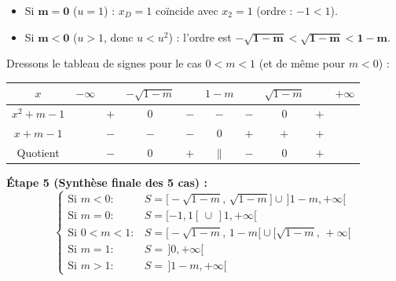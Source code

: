 \begin{exemple}
\begin{enumerate}
\begin{itemize}
        \item Si $\mathbf{m = 0}$ ($u = 1$) : $x_D = 1$ coïncide avec $x_2 = 1$ (ordre : $-1 < 1$).
        \item Si $\mathbf{m < 0}$ ($u > 1$, donc $u < u^2$) : l'ordre est $\mathbf{-\sqrt{1 - m} < \sqrt{1 - m} < 1 - m}$.
    \end{itemize}
    Dressons le tableau de signes pour le cas $0 < m < 1$ (et de même pour $m < 0$) :
    \begin{center}
    \renewcommand{\arraystretch}{1.2}
    \begin{tabular}{c|ccccccccc}
        $x$ & $-\infty$ & & $-\sqrt{1-m}$ & & $1-m$ & & $\sqrt{1-m}$ & & $+\infty$ \\ \hline
        $x^2 + m - 1$ & & $+$ & $0$ & $-$ & $-$ & $-$ & $0$ & $+$ & \\
        $x + m - 1$ & & $-$ & $-$ & $-$ & $0$ & $+$ & $+$ & $+$ & \\ \hline
        Quotient & & $-$ & $0$ & $+$ & $\|$ & $-$ & $0$ & $+$ &
    \end{tabular}
    \end{center}
\end{enumerate}
\textbf{Étape 5 (Synthèse finale des 5 cas) :}
\[
    \boxed{\begin{cases}
        \text{Si } m < 0 : & S = \bigl[-\sqrt{1 - m},\, \sqrt{1 - m}\bigr] \cup \,]1 - m, +\infty[ \\
        \text{Si } m = 0 : & S = [-1, 1[ \,\cup\, ]1, +\infty[ \\
        \text{Si } 0 < m < 1 : & S = \bigl[-\sqrt{1 - m},\, 1 - m\bigr[ \cup \bigl[\sqrt{1 - m},\, +\infty\bigr[ \\
        \text{Si } m = 1 : & S = \,]0, +\infty[ \\
        \text{Si } m > 1 : & S = \,]1 - m, +\infty[
    \end{cases}}
\]
\end{exemple}

